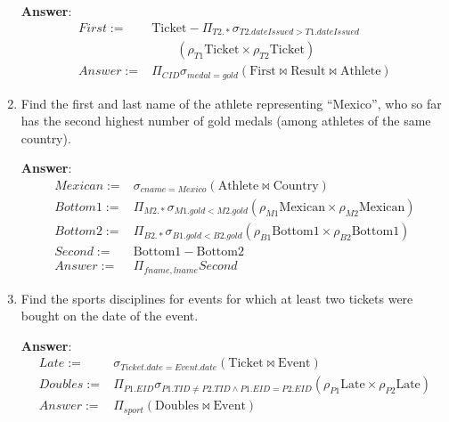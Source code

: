 \documentclass{article}
\begin{document}
\begin{enumerate}
{\bf Answer}:\\[5pt]
\begin{equation}
\begin{aligned}
First := & \mathrm{Ticket} - \Pi_{T2.*} \sigma_{T2.dateIssued > T1.dateIssued} \\
    & \quad \quad (\rho_{T1} \mathrm{Ticket} \times \rho_{T2} \mathrm{Ticket}) \\
Answer := & \Pi_{CID} \sigma_{medal=gold}(\mathrm{First} \bowtie \mathrm{Result} \bowtie \mathrm{Athlete})
\end{aligned}
\end{equation}


\item   %
Find the first and last name of the athlete representing ``Mexico'', who so far
has the second highest number of gold medals (among athletes of the same country).

{\bf Answer}:\\[5pt]
\begin{equation}
\begin{aligned}
Mexican := & \sigma_{cname=Mexico} (\mathrm{Athlete} \bowtie \mathrm{Country}) \\
Bottom1 := & \Pi_{M2.*} \sigma_{M1.gold < M2.gold} (\rho_{M1} \mathrm{Mexican} \times \rho_{M2} \mathrm{Mexican}) \\
Bottom2 := & \Pi_{B2.*} \sigma_{B1.gold < B2.gold} (\rho_{B1} \mathrm{Bottom1} \times \rho_{B2} \mathrm{Bottom1}) \\
Second := & \mathrm{Bottom1} - \mathrm{Bottom2} \\
Answer := & \Pi_{fname, lname} Second
\end{aligned}
\end{equation}


\item   %
Find the sports disciplines for events for which at least two tickets
were bought on the date of the event.

{\bf Answer}:\\[5pt]
\begin{equation}
\begin{aligned}
Late := & \sigma_{Ticket.date=Event.date} (\mathrm{Ticket} \bowtie \mathrm{Event}) \\
Doubles := & \Pi_{P1.EID} \sigma_{P1.TID \neq P2.TID \land P1.EID = P2.EID} (\rho_{P1} \mathrm{Late} \times \rho_{P2} \mathrm{Late}) \\
Answer := & \Pi_{sport} (\mathrm{Doubles} \bowtie \mathrm{Event})
\end{aligned}
\end{equation}


\end{enumerate}
\end{document}
